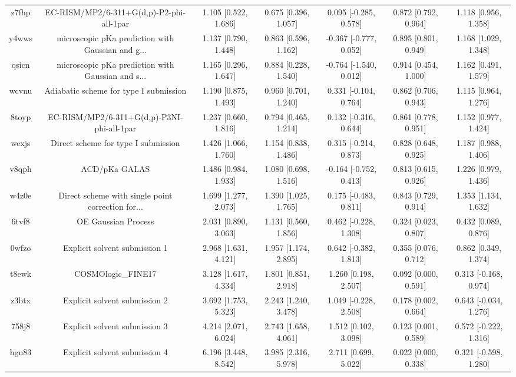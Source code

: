 \documentclass{article}
\begin{document}
\begin{center}
\begin{longtable}{|ccccccc|}
 z7fhp &           EC-RISM/MP2/6-311+G(d,p)-P2-phi-all-1par &  1.105 [0.522, 1.686] &  0.675 [0.396, 1.057] &    0.095 [-0.285, 0.578] &  0.872 [0.792, 0.964] &   1.118 [0.956, 1.358] \\
 y4wws &  microscopic pKa prediction with Gaussian and g... &  1.137 [0.790, 1.448] &  0.863 [0.596, 1.162] &   -0.367 [-0.777, 0.052] &  0.895 [0.801, 0.949] &   1.168 [1.029, 1.348] \\
 qsicn &  microscopic pKa prediction with Gaussian and s... &  1.165 [0.296, 1.647] &  0.884 [0.228, 1.540] &   -0.764 [-1.540, 0.012] &  0.914 [0.454, 1.000] &   1.162 [0.491, 1.579] \\
 wcvnu &             Adiabatic scheme for type I submission &  1.190 [0.875, 1.493] &  0.960 [0.701, 1.240] &    0.331 [-0.104, 0.764] &  0.862 [0.706, 0.943] &   1.115 [0.964, 1.276] \\
 8toyp &         EC-RISM/MP2/6-311+G(d,p)-P3NI-phi-all-1par &  1.237 [0.660, 1.816] &  0.794 [0.465, 1.214] &    0.132 [-0.316, 0.644] &  0.861 [0.778, 0.951] &   1.152 [0.977, 1.424] \\
 wexjs &                Direct scheme for type I submission &  1.426 [1.066, 1.760] &  1.154 [0.838, 1.486] &    0.315 [-0.214, 0.873] &  0.828 [0.648, 0.925] &   1.187 [0.988, 1.406] \\
 v8qph &                                      ACD/pKa GALAS &  1.486 [0.984, 1.933] &  1.080 [0.698, 1.516] &   -0.164 [-0.752, 0.413] &  0.813 [0.615, 0.926] &   1.226 [0.979, 1.436] \\
 w4z0e &  Direct scheme with single point correction for... &  1.699 [1.277, 2.073] &  1.390 [1.025, 1.765] &    0.175 [-0.483, 0.811] &  0.843 [0.729, 0.914] &   1.353 [1.134, 1.632] \\
 6tvf8 &                                OE Gaussian Process &  2.031 [0.890, 3.063] &  1.131 [0.560, 1.856] &    0.462 [-0.228, 1.308] &  0.324 [0.023, 0.807] &   0.432 [0.089, 0.876] \\
 0wfzo &                      Explicit solvent submission 1 &  2.968 [1.631, 4.121] &  1.957 [1.174, 2.895] &    0.642 [-0.382, 1.813] &  0.355 [0.076, 0.712] &   0.862 [0.349, 1.374] \\
 t8ewk &                                 COSMOlogic\_FINE17 &  3.128 [1.617, 4.334] &  1.801 [0.851, 2.918] &     1.260 [0.198, 2.507] &  0.092 [0.000, 0.591] &  0.313 [-0.168, 0.974] \\
 z3btx &                      Explicit solvent submission 2 &  3.692 [1.753, 5.323] &  2.243 [1.240, 3.478] &    1.049 [-0.228, 2.508] &  0.178 [0.002, 0.664] &  0.643 [-0.034, 1.276] \\
 758j8 &                      Explicit solvent submission 3 &  4.214 [2.071, 6.024] &  2.743 [1.658, 4.061] &     1.512 [0.102, 3.098] &  0.123 [0.001, 0.589] &  0.572 [-0.222, 1.316] \\
 hgn83 &                      Explicit solvent submission 4 &  6.196 [3.448, 8.542] &  3.985 [2.316, 5.978] &     2.711 [0.699, 5.022] &  0.022 [0.000, 0.338] &  0.321 [-0.598, 1.280] \\
\end{longtable}
\end{center}
\end{document}
